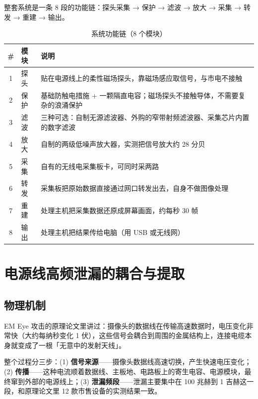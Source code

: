 \documentclass[a4paper,11pt,oneside,UTF8,scheme=plain]{ctexart}
\begin{document}
整套系统是一条 8 段的功能链：探头采集 → 保护 → 滤波 → 放大 → 采集 → 转发 → 重建 → 输出。

\begin{table}[H]
\centering
\caption{系统功能链（8 个模块）}
\label{tab:block-diagram}
\footnotesize
\begin{tabularx}{\textwidth}{cl>{\raggedright\arraybackslash}X}
\toprule
\rowcolor{tableheader}
\textbf{\#} & \textbf{模块} & \textbf{说明} \\
\midrule
1 & 探头   & 贴在电源线上的柔性磁场探头，靠磁场感应取信号，与市电不接触 \\
2 & 保护   & 基础防触电措施 + 一颗隔直电容；磁场探头不接触导体，不需要复杂的浪涌保护 \\
3 & 滤波   & 三种可选：自制无源滤波器、外购的窄带射频滤波器、采集芯片内置的数字滤波 \\
4 & 放大   & 自制的两级低噪声放大器，实测把信号放大约 28 分贝 \\
5 & 采集   & 自有的无线电采集板卡，可同时采两路 \\
6 & 转发   & 采集板把原始数据直接通过网口转发出去，自身不做图像处理 \\
7 & 重建   & 处理主机把采集数据还原成屏幕画面，约每秒 30 帧 \\
8 & 输出   & 处理主机把结果传给电脑（用 USB 或无线网） \\
\bottomrule
\end{tabularx}
\end{table}

\section{电源线高频泄漏的耦合与提取}
\label{sec:ch2}

\subsection{物理机制}
\label{sec:ch2-phy}

EM Eye 攻击的原理论文里讲过：摄像头的数据线在传输高速数据时，电压变化非常快（大约每纳秒变化 1 伏），这些信号会耦合到周围的金属结构上，连接电缆本身就变成了一根「无意中的发射天线」。

整个过程分三步：(1) \textbf{信号来源}——摄像头数据线高速切换，产生快速电压变化；(2) \textbf{传播}——这种电流顺着数据线、主板地、电路板上的寄生电容、电源模块，最终窜到外部的电源线上；(3) \textbf{泄漏频段}——泄漏主要集中在 100 兆赫到 1 吉赫这一段，和原理论文里 12 款市售设备的实测结果一致。
\end{document}
